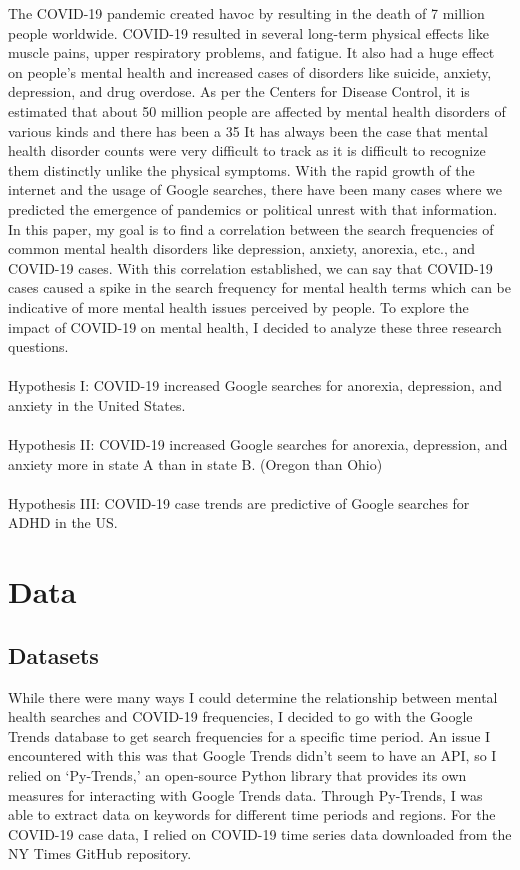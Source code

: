 \documentclass{article}
\begin{document}
The COVID-19 pandemic created havoc by resulting in the death of 7 million people worldwide.
COVID-19 resulted in several long-term physical effects like muscle pains, upper respiratory problems,
and fatigue. It also had a huge effect on people’s mental health and increased cases of disorders like
suicide, anxiety, depression, and drug overdose. As per the Centers for Disease Control, it is
estimated that about 50 million people are affected by mental health disorders of various kinds and
there has been a 35%
It has always been the case that mental health disorder counts were very difficult to track as it is
difficult to recognize them distinctly unlike the physical symptoms.
With the rapid growth of the internet and the usage of Google searches, there have been many cases
where we predicted the emergence of pandemics or political unrest with that information. In this paper,
my goal is to find a correlation between the search frequencies of common mental health disorders
like depression, anxiety, anorexia, etc., and COVID-19 cases. With this correlation established, we can
say that COVID-19 cases caused a spike in the search frequency for mental health terms which can
be indicative of more mental health issues perceived by people.
To explore the impact of COVID-19 on mental health, I decided to analyze these three research
questions.
\\
\\Hypothesis I: COVID-19 increased Google searches for anorexia, depression, and anxiety in the
United States.
\\
\\Hypothesis II: COVID-19 increased Google searches for anorexia, depression, and anxiety more
in state A than in state B. (Oregon than Ohio)
\\
\\Hypothesis III: COVID-19 case trends are predictive of Google searches for ADHD in the US.

\section{Data}

\subsection{Datasets}

While there were many ways I could determine the relationship between mental health searches
and COVID-19 frequencies, I decided to go with the Google Trends database to get search
frequencies for a specific time period. An issue I encountered with this was that Google Trends
didn’t seem to have an API, so I relied on ‘Py-Trends,’ an open-source Python library that
provides its own measures for interacting with Google Trends data. Through Py-Trends, I was
able to extract data on keywords for different time periods and regions. For the COVID-19 case
data, I relied on COVID-19 time series data downloaded from the NY Times GitHub repository.
\end{document}
